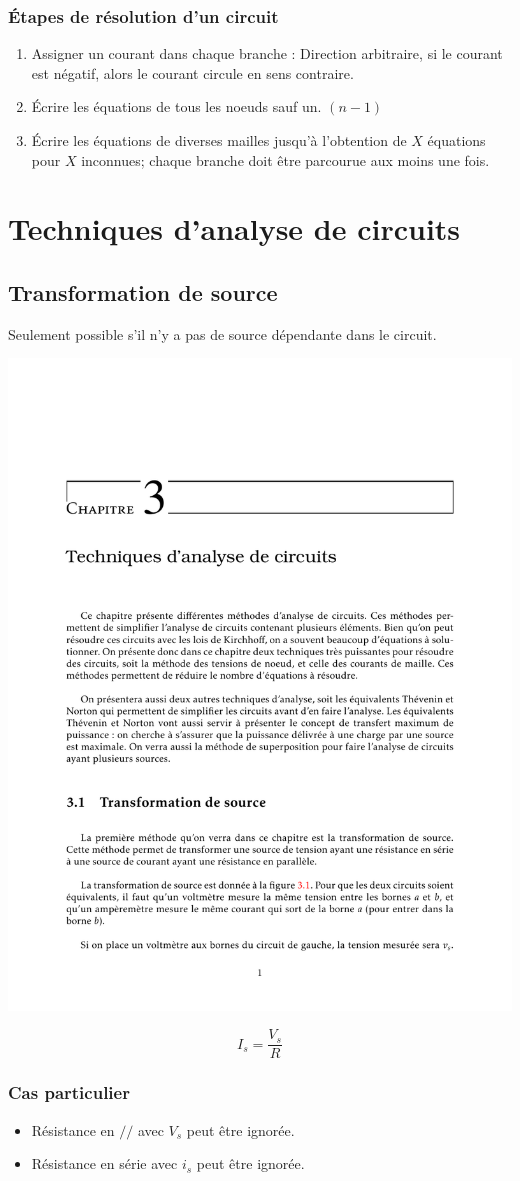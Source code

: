 \subsubsection{Étapes de résolution d'un circuit}
\begin{enumerate}%
    \item Assigner un courant dans chaque branche : Direction arbitraire, si le courant est négatif, alors le courant circule en sens contraire.
    \item Écrire les équations de tous les noeuds sauf un. $(n-1)$
    \item Écrire les équations de diverses mailles jusqu'à l'obtention de $X$ équations pour $X$ inconnues; chaque branche doit être parcourue aux moins une fois.
\end{enumerate}


\section{Techniques d’analyse de circuits}
\subsection{Transformation de source}
Seulement possible s'il n'y a pas de source dépendante dans le circuit.
\begin{multicols*}{2} 
\centering
\includegraphics[trim={1.75in 8.375in 1.75in 1in}, clip=true,page=2,height=.85in]{fig/equiv.pdf}

\begin{equation*}
    I_s = \frac{V_s}{R}
\end{equation*}
\end{multicols*}
\vspace{-1\baselineskip}

\subsubsection{Cas particulier}
\begin{itemize}[nosep]
    \item Résistance en $//$ avec $V_s$ peut être ignorée.
    \item Résistance en série avec $i_s$ peut être ignorée.
\end{itemize}


